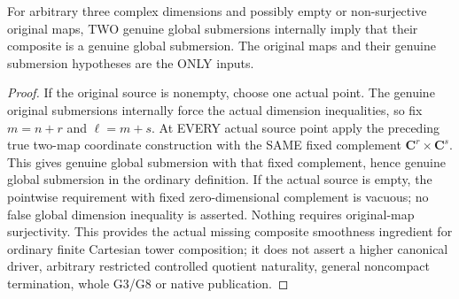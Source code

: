 \begin{theorem}
\label{hir:submersion-composition-original-global}
\leanok
{}
For arbitrary three complex dimensions and possibly empty or non-surjective
original maps, TWO genuine global submersions internally imply that their
composite is a genuine global submersion. The original maps and their genuine
submersion hypotheses are the ONLY inputs.
\end{theorem}
\begin{proof}
If the original source is nonempty, choose one actual point. The genuine
original submersions internally force the actual dimension inequalities,
so fix $m=n+r$ and $\ell=m+s$. At EVERY actual source point apply the preceding
true two-map coordinate construction with the SAME fixed complement
$\mathbf C^r\times\mathbf C^s$. This gives genuine global submersion with
that fixed complement, hence genuine global submersion in the ordinary
definition. If the actual source is empty, the pointwise requirement with
fixed zero-dimensional complement is vacuous; no false global dimension
inequality is asserted. Nothing requires original-map surjectivity.
This provides the actual missing composite smoothness ingredient for
ordinary finite Cartesian tower composition; it does not assert a higher
canonical driver, arbitrary restricted controlled quotient naturality,
general noncompact termination, whole G3/G8 or native publication.
\end{proof}
